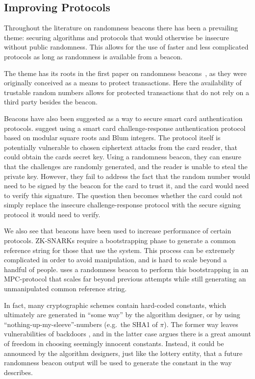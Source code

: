 \subsection{Improving Protocols}
Throughout the literature on randomness beacons there has been a prevailing theme: securing algorithms and protocols that would otherwise be insecure without public randomness. This allows for the use of faster and less complicated protocols as long as randomness is available from a beacon.

The theme has its roots in the first paper on randomness beacons~\cite{rabin1983transaction}, as they were originally conceived as a means to protect transactions. Here the availability of trustable random numbers allows for protected transactions that do not rely on a third party besides the beacon.

Beacons have also been suggested as a way to secure smart card authentication protocols. \citet{fischer2011publicrandomnessservice} suggest using a smart card challenge-response authentication protocol based on modular square roots and Blum integers. The protocol itself is potentially vulnerable to chosen ciphertext attacks from the card reader, that could obtain the cards secret key. Using a randomness beacon, they can ensure that the challenges are randomly generated, and the reader is unable to steal the private key. However, they fail to address the fact that the random number would need to be signed by the beacon for the card to trust it, and the card would need to verify this signature. The question then becomes whether the card could not simply replace the insecure challenge-response protocol with the secure signing protocol it would need to verify.

We also see that beacons have been used to increase performance of certain protocols. ZK-SNARKs require a bootstrapping phase to generate a common reference string for those that use the system. This process can be extremely complicated in order to avoid manipulation, and is hard to scale beyond a handful of people. \citet{mpcsnarks} uses a randomness beacon to perform this bootstrapping in an MPC-protocol that scales far beyond previous attempts while still generating an unmanipulated common reference string.

In fact, many cryptographic schemes contain hard-coded constants, which ultimately are generated in \enquote{some way} by the algorithm designer, or by using \enquote{nothing-up-my-sleeve}-numbers (e.g.\ the SHA1 of $\pi$).
The former way leaves vulnerabilities of backdoors \cite{nytimes-nsabackdoors}, and in the latter case \citet{bernstein2015manipulate} argues there is a great amount of freedom in choosing seemingly innocent constants.
Instead, it could be announced by the algorithm designers, just like the lottery entity, that a future randomness beacon output will be used to generate the constant in the way \citet{baigneres2015trap} describes.
